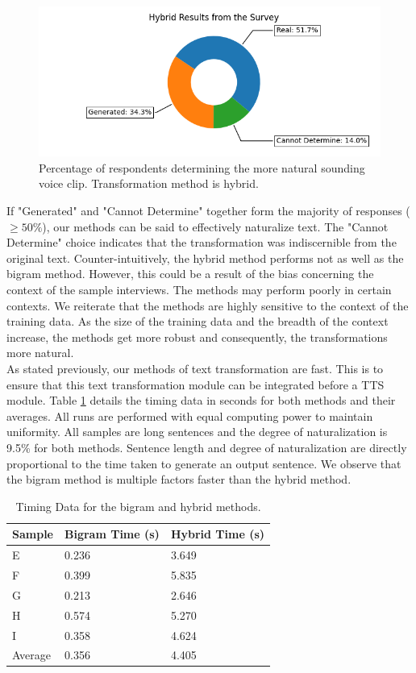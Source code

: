 \documentclass[journal]{IEEEtran}
\begin{document}
\begin{figure}
\centerline{\includegraphics[width=\columnwidth]{hybrid.png}}
\caption{Percentage of respondents determining the more natural sounding voice clip. Transformation method is hybrid.}
\label{fig2}
\end{figure}

If "Generated" and "Cannot Determine" together form the majority of responses ($\geq 50\%$), our methods can be said to effectively naturalize text. The "Cannot Determine" choice indicates that the transformation was indiscernible from the original text. Counter-intuitively, the hybrid method performs not as well as the bigram method. However, this could be a result of the bias concerning the context of the sample interviews. The methods may perform poorly in certain contexts. We reiterate that the methods are highly sensitive to the context of the training data. As the size of the training data and the breadth of the context increase, the methods get more robust and consequently, the transformations more natural. \\

As stated previously, our methods of text transformation are fast. This is to ensure that this text transformation module can be integrated before a TTS module. Table \ref{tab5} details the timing data in seconds for both methods and their averages. All runs are performed with equal computing power to maintain uniformity. All samples are long sentences and the degree of naturalization is 9.5\% for both methods. Sentence length and degree of naturalization are directly proportional to the time taken to generate an output sentence. We observe that the bigram method is multiple factors faster than the hybrid method.


\begin{table}
\caption{Timing Data for the bigram and hybrid methods.}
\label{tab5}
\small
\setlength{\tabcolsep}{3pt}
\begin{tabular}{|p{77pt}|p{77pt}|p{77pt}|}
\hline
Sample& 
Bigram Time (s)& 
Hybrid Time (s) \\
\hline
E & 0.236 & 3.649 \\
F & 0.399 & 5.835 \\
G & 0.213 & 2.646 \\
H & 0.574 & 5.270 \\
I & 0.358 & 4.624 \\
\hline
Average & 0.356 & 4.405 \\
\hline
\end{tabular}
\label{tab5}
\end{table}
\end{document}
